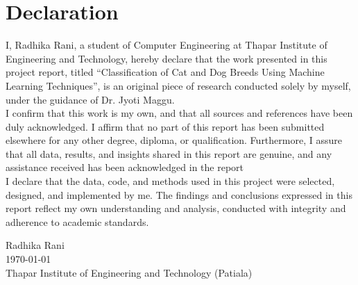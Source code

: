 \documentclass[a4paper,11pt,oneside]{book}
\begin{document}
    
    \newpage
    \thispagestyle{empty}
    \chapter*{\Large Declaration}

  I, Radhika Rani, a student of Computer Engineering  at Thapar Institute of Engineering and Technology, hereby declare that the work presented in this project report, titled “Classification of Cat and Dog Breeds Using Machine Learning Techniques”, is an original piece of research conducted solely by myself, under the guidance of Dr. Jyoti Maggu.\\[0.1cm] 
    
    \noindent
    I confirm that this work is my own, and that all sources and references have been duly acknowledged. I affirm that no part of this report has been submitted elsewhere for any other degree, diploma, or qualification. Furthermore, I assure that all data, results, and insights shared in this report are genuine, and any assistance received has been acknowledged in the report\\[0.1cm] 
    
    \noindent
    I declare that the data, code, and methods used in this project were selected, designed, and implemented by me. The findings and conclusions expressed in this report reflect my own understanding and analysis, conducted with integrity and adherence to academic standards.
    ~\\[1cm]
    \begin{flushright}
	
	Radhika Rani \\
    
    \today\\
    Thapar Institute of Engineering and Technology (Patiala)
    \end{flushright}

     
    
    
   
\end{document}
